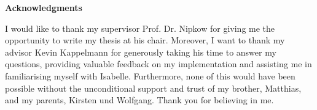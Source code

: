 \thispagestyle{empty}
\vspace*{20mm}

\begin{center}
\textbf{{Acknowledgments}}
\end{center}

\vspace{10mm}

I would like to thank my supervisor Prof. Dr. Nipkow for giving me the opportunity to write my thesis at his chair. Moreover, I want to thank my advisor Kevin Kappelmann for generously taking his time to answer my questions, providing valuable feedback on my implementation and assisting me in familiarising myself with Isabelle. Furthermore, none of this would have been possible without the unconditional support and trust of my brother, Matthias, and my parents, Kirsten und Wolfgang. Thank you for believing in me.

\cleardoublepage{}
